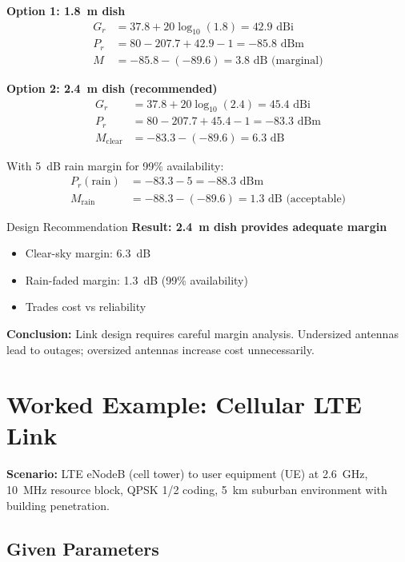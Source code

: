 \textbf{Option 1: 1.8~m dish}
\begin{align*}
G_r &= 37.8 + 20\log_{10}(1.8) = 42.9\text{~dBi} \\
P_r &= 80 - 207.7 + 42.9 - 1 = -85.8\text{~dBm} \\
M &= -85.8 - (-89.6) = 3.8\text{~dB (marginal)}
\end{align*}

\textbf{Option 2: 2.4~m dish (recommended)}
\begin{align*}
G_r &= 37.8 + 20\log_{10}(2.4) = 45.4\text{~dBi} \\
P_r &= 80 - 207.7 + 45.4 - 1 = -83.3\text{~dBm} \\
M_{\text{clear}} &= -83.3 - (-89.6) = 6.3\text{~dB}
\end{align*}

With 5~dB rain margin for 99\% availability:
\begin{align*}
P_r(\text{rain}) &= -83.3 - 5 = -88.3\text{~dBm} \\
M_{\text{rain}} &= -88.3 - (-89.6) = 1.3\text{~dB (acceptable)}
\end{align*}

\begin{calloutbox}[colback=black!8!white,colframe=black]{Design Recommendation}
\textbf{Result: 2.4~m dish provides adequate margin}

\begin{itemize}
\item Clear-sky margin: 6.3~dB
\item Rain-faded margin: 1.3~dB (99\% availability)
\item Trades cost vs reliability
\end{itemize}

\textbf{Conclusion:} Link design requires careful margin analysis. Undersized antennas lead to outages; oversized antennas increase cost unnecessarily.
\end{calloutbox}

\section{Worked Example: Cellular LTE Link}

\textbf{Scenario:} LTE eNodeB (cell tower) to user equipment (UE) at 2.6~GHz, 10~MHz resource block, QPSK 1/2 coding, 5~km suburban environment with building penetration.

\subsection*{Given Parameters}

